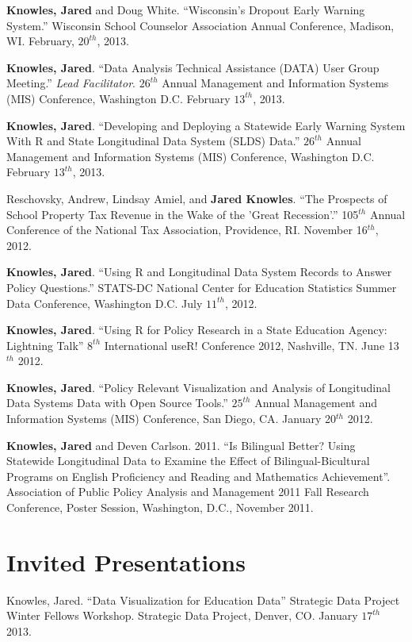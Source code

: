 \documentclass[margin,line]{res}
\begin{document}
\begin{resume}
\textbf{Knowles, Jared} and Doug White. ``Wisconsin's Dropout Early Warning System.'' Wisconsin School Counselor Association Annual Conference, Madison, WI. February, $20^{th}$, 2013. 

\textbf{Knowles, Jared}. ``Data Analysis Technical Assistance (DATA) User Group Meeting.'' \emph{Lead Facilitator}. $26^{th}$ Annual Management and Information Systems (MIS) Conference, Washington D.C. February $13^{th}$, 2013.

\textbf{Knowles, Jared}. ``Developing and Deploying a Statewide Early Warning System With R and State Longitudinal Data System (SLDS) Data.'' $26^{th}$ Annual Management and Information Systems (MIS) Conference, Washington D.C. February $13^{th}$, 2013.

Reschovsky, Andrew, Lindsay Amiel, and \textbf{Jared Knowles}. ``The Prospects of School Property Tax Revenue in the Wake of the 'Great Recession'.'' 105$^{th}$ Annual Conference of the National Tax Association, Providence, RI. November 16$^{th}$, 2012. 

\textbf{Knowles, Jared}. ``Using R and Longitudinal Data System Records to Answer Policy Questions.'' STATS-DC National Center for Education Statistics Summer Data Conference, Washington D.C. July $11^{th}$, 2012.

\textbf{Knowles, Jared}. ``Using R for Policy Research in a State Education Agency: Lightning Talk'' $8^{th}$ International useR! Conference 2012, Nashville, TN. June 13$^{th}$ 2012.

\textbf{Knowles, Jared}. ``Policy Relevant Visualization and Analysis of Longitudinal Data Systems Data with Open Source Tools.'' $25^{th}$ Annual Management and Information Systems (MIS) Conference, San Diego, CA. January 20$^{th}$ 2012.

\textbf{Knowles, Jared} and Deven Carlson. 2011. ``Is Bilingual Better? Using Statewide Longitudinal Data to Examine the Effect of Bilingual-Bicultural Programs on English Proficiency and Reading and Mathematics Achievement''. Association of Public Policy Analysis and Management 2011 Fall Research Conference, Poster Session, Washington, D.C., November 2011.

\section{\sc Invited Presentations}

Knowles, Jared. ``Data Visualization for Education Data'' Strategic Data Project Winter Fellows Workshop. Strategic Data Project, Denver, CO. January $17^{th}$ 2013. 


\end{resume}
\end{document}
